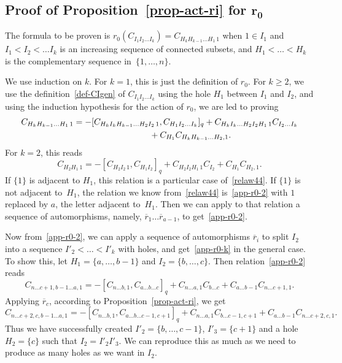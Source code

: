 \documentclass[pdftex]{sigma}
\numberwithin{equation}{section}
\theoremstyle{definition}
\newcommand{\rb}{\overline{r}}
\begin{document}
\subsection[Proof of Proposition~\ref{prop-act-ri} for r\_0]{Proof of Proposition~\ref{prop-act-ri} for $\boldsymbol{r_0}$}
The formula to be proven is $r_0(C_{I_1I_2\dots I_k})=C_{H_kH_{k-1}\dots H_1\, 1}$ when $1\in I_1$ and $I_1<I_2<\dots I_k$ is an increasing sequence of connected subsets, and $H_1<\dots <H_k$ is the complementary sequence in~$\{1,\dots,n\}$.

We use induction on $k$. For $k=1$, this is just the definition of $r_0$. For $k\geq 2$, we use the definition~\eqref{def-CIgen} of $C_{I_1I_2\dots I_k}$ using the hole $H_1$ between $I_1$ and $I_2$, and using the induction hypothesis for the action of $r_0$, we are led to proving
\begin{gather}\label{app-r0-k}
C_{H_kH_{k-1}\dots H_1\, 1}=-[C_{H_kI_kH_{k-1}\dots H_2I_2\, 1},C_{H_1I_2\dots I_k}]_q+C_{H_kI_k\dots H_2I_2H_1\, 1}C_{I_2\dots I_k}\nonumber\\
\hphantom{C_{H_kH_{k-1}\dots H_1\, 1}=}{} +C_{H_1}C_{H_kH_{k-1}\dots H_2 ,1} .\end{gather}
For $k=2$, this reads
\begin{equation}\label{app-r0-2}
C_{H_2H_1\, 1}=-[C_{H_2I_2\, 1},C_{H_1I_2}]_q+C_{H_2I_2H_1\, 1}C_{I_2}+C_{H_1}C_{H_2 ,1} .
\end{equation}
If $\{1\}$ is adjacent to $H_1$, this relation is a particular case of~\eqref{relaw44}. If $\{1\}$ is not adjacent to~$H_1$, the relation we know from~\eqref{relaw44} is~\eqref{app-r0-2} with $1$ replaced by $a$, the letter adjacent to~$H_1$. Then we can apply to that relation a sequence of automorphisms, namely, $\rb_1\dots \rb_{a-1}$, to get~\eqref{app-r0-2}.

Now from~\eqref{app-r0-2}, we can apply a sequence of automorphisms $\rb_i$ to split $I_2$ into a sequence $I'_2<\dots <I'_k$ with holes, and get~\eqref{app-r0-k} in the general case. To show this, let $H_1=\{a,\dots,b-1\}$ and $I_2=\{b,\dots,c\}$. Then relation~\eqref{app-r0-2} reads
\[C_{n\dots c+1 , b-1\dots a ,1}=-[C_{n\dots b ,1},C_{a\dots b \dots c}]_q+C_{n\dots a , 1}C_{b\dots c}+C_{a\dots b-1}C_{n\dots c+1 ,1} .\]
Applying $\rb_c$, according to Proposition~\ref{prop-act-ri}, we get
\[C_{n\dots c+2 , c , b-1\dots a ,1}=-[C_{n\dots b ,1},C_{a\dots b \dots c-1 ,c+1}]_q+C_{n\dots a , 1}C_{b\dots c-1 ,c+1}+C_{a\dots b-1}C_{n\dots c+2 ,c ,1} .\]
Thus we have successfully created $I'_2=\{b,\dots,c-1\}$, $I'_3=\{c+1\}$ and a hole $H_2=\{c\}$ such that $I_2=I'_2I'_3$. We can reproduce this as much as we need to produce as many holes as we want in $I_2$.
\end{document}
